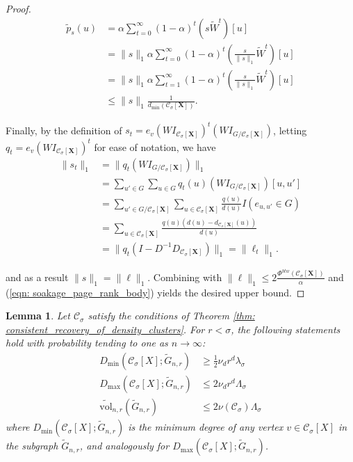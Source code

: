 \documentclass{article}
\newcommand{\vol}{\mathrm{vol}}
\newcommand{\1}{\mathbf{1}}
\newcommand{\Xbf}{\mathbf{X}}
\newcommand{\Cset}{\mathcal{C}}
\newcommand{\Csig}{\Cset_{\sigma}}
\theoremstyle{aldenthm}
\newtheorem{lemma}{Lemma}
\begin{document}
\begin{proof}
	\begin{align} \label{eqn: soakage_page_rank_body}
	\widetilde{p}_{s}(u) & = \alpha \sum_{t = 0}^{\infty} (1 - \alpha)^t \left(s \widetilde{W}^t \right)[u]  \nonumber \\
	& = \|s\|_1 \alpha \sum_{t = 0}^{\infty} (1 - \alpha)^t \left(\frac{s}{\|s\|_1}  \widetilde{W}^t \right)[u]\nonumber \\
	& = \|s\|_1 \alpha \sum_{t = 1}^{\infty} (1 - \alpha)^t \left(\frac{s}{\|s\|_1}  \widetilde{W}^t \right)[u]\nonumber \\
	& \leq \|s\|_1 \frac{1}{d_{\min}(\Csig[\Xbf])}.
	\end{align}
	
	Finally, by the definition of $s_t = e_v (W I_{\Csig[\Xbf]})^t (W I_{G / \Csig[\Xbf]})$, letting $q_t = e_v (W I_{\Csig[\Xbf]})^t$ for ease of notation, we have
	\begin{align*}
	\|s_t\|_1 & = \|q_t (W I_{G / \Csig[\Xbf]})\|_1 \\
	& = \sum_{u' \in G} \sum_{u \in G} q_t(u) (W I_{G / \Csig[\Xbf]})[u, u'] \\
	& = \sum_{u' \in G / \Csig[\Xbf]} \sum_{u \in \Csig[\Xbf]} \frac{q(u)}{d(u)} I(e_{u,u'} \in G) \\
	& = \sum_{u \in \Csig[\Xbf]} \frac{q(u) (d(u) - d_{\Csig[\Xbf]}(u) )}{d(u)} \\
	& = \|q_t (I - D^{-1} D_{\Csig[\Xbf]})\|_1 = \|\ell_t\|_1.
	\end{align*}
	
	and as a result $\|s\|_1 = \|\ell\|_1$. Combining with $\|\ell\|_1 \leq 2 \frac{\Phi^{btw}(\Csig[\Xbf])}{\alpha}$ and (\ref{eqn: soakage_page_rank_body}) yields the desired upper bound.
	
\end{proof}

\begin{lemma}
	\label{lem: ball_bounds_in_probability}
	Let $\Csig$ satisfy the conditions of Theorem \ref{thm: consistent_recovery_of_density_clusters}. For $r < \sigma$, the following statements hold with probability tending to one as $n \to \infty$:
	\begin{align*}
	D_{\min}(\Csig[X]; \widetilde{G}_{n,r}) & \geq \frac{1}{2} \nu_d r^d \lambda_{\sigma} \\
	D_{\max}(\Csig[X]; \widetilde{G}_{n,r}) & \leq 2 \nu_d r^d \Lambda_{\sigma} \\
	\widetilde{\vol}_{n,r}(\widetilde{G}_{n,r}) & \leq 2 \nu(\Csig) \Lambda_{\sigma}
	\end{align*}
	 where $D_{\min}(\Csig[X]; \widetilde{G}_{n,r})$ is the minimum degree of any vertex $v \in \Csig[X]$ in the subgraph $\widetilde{G}_{n,r}$, and analogously for $D_{\max}(\Csig[X]; \widetilde{G}_{n,r})$.
\end{lemma}
\end{document}
